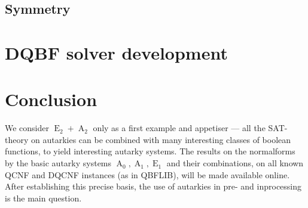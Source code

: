 \documentclass[conference]{IEEEtran}
\DeclareMathOperator{\Aaut}{A}
\DeclareMathOperator{\Eaut}{E}
\begin{document}
\subsection{Symmetry}
\label{sec:sym}

\section{DQBF solver development}
\label{sec:dev}

\section{Conclusion}
\label{sec:conc}

We consider $\Eaut_2 + \Aaut_2$ only as a first example and appetiser --- all the SAT-theory on autarkies can be combined with many interesting classes of boolean functions, to yield interesting autarky systems.
The results on the normalforms by the basic autarky systems $\Aaut_0, \Aaut_1, \Eaut_1$ and their combinations, on all known QCNF and DQCNF instances (as in QBFLIB), will be made available online.
After establishing this precise basis, the use of autarkies in pre- and inprocessing is the main question.





\end{document}
